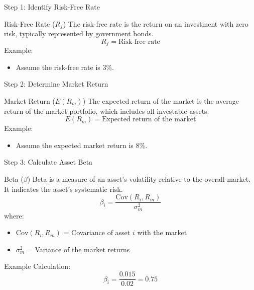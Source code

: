 \documentclass{beamer}
\begin{document}
\begin{frame}{Step 1: Identify Risk-Free Rate}
  \begin{block}{Risk-Free Rate (\(R_f\))}
    The risk-free rate is the return on an investment with zero risk, typically represented by government bonds.
    \begin{equation*}
      R_f = \text{Risk-free rate}
    \end{equation*}
    Example:
    \begin{itemize}
      \item Assume the risk-free rate is 3\%.
    \end{itemize}
  \end{block}
\end{frame}

\begin{frame}{Step 2: Determine Market Return}
  \begin{block}{Market Return (\(E(R_m)\))}
    The expected return of the market is the average return of the market portfolio, which includes all investable assets.
    \begin{equation*}
      E(R_m) = \text{Expected return of the market}
    \end{equation*}
    Example:
    \begin{itemize}
      \item Assume the expected market return is 8\%.
    \end{itemize}
  \end{block}
\end{frame}

\begin{frame}{Step 3: Calculate Asset Beta}
  \begin{block}{Beta (\(\beta\))}
    Beta is a measure of an asset's volatility relative to the overall market. It indicates the asset's systematic risk.
    \begin{equation*}
      \beta_i = \frac{\text{Cov}(R_i, R_m)}{\sigma_m^2}
    \end{equation*}
    where:
    \begin{itemize}
      \item \( \text{Cov}(R_i, R_m) \) = Covariance of asset \( i \) with the market
      \item \( \sigma_m^2 \) = Variance of the market returns
    \end{itemize}
    Example Calculation:
    \begin{equation*}
      \beta_i = \frac{0.015}{0.02} = 0.75
    \end{equation*}
  \end{block}
\end{frame}
\end{document}
